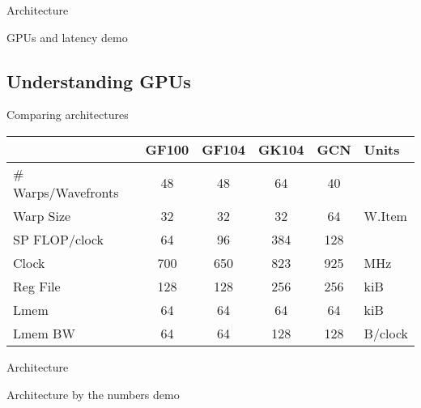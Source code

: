 \documentclass[english,compress]{beamer}
\begin{document}

\begin{frame}{Architecture}
  \begin{center}
  \Huge GPUs and latency demo
  \end{center}
\end{frame}
\subsection{Understanding GPUs}
\begin{frame}{Comparing architectures}
  \begin{tabular}{l|cccc|l}
    & GF100 & GF104 & GK104 & GCN & Units\\
    \hline
    \# Warps/Wavefronts & 48 & 48 & 64 & 40 \\
    Warp Size & 32 & 32 & 32 & 64 & W.Item \\
    \hline
    SP FLOP/clock & 64 & 96 & 384 & 128 \\
    Clock & 700 & 650 & 823 & 925 & MHz \\
    \hline
    Reg File & 128 & 128 & 256 & 256 & kiB \\
    Lmem & 64  & 64 & 64 & 64 & kiB \\
    Lmem BW & 64  & 64 & 128 & 128 & B/clock \\
    \hline
  \end{tabular}
\end{frame}
\begin{frame}{Architecture}
  \begin{center}
  \Huge Architecture by the numbers demo
  \end{center}
\end{frame}


\questionframe{}
\end{document}
